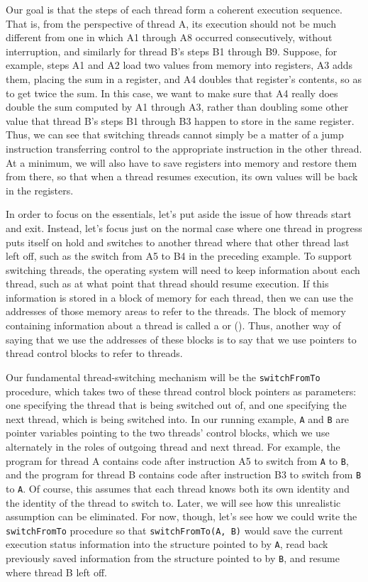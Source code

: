 Our goal is that the steps of each thread form a coherent execution
sequence.  That is, from the perspective of thread A, its execution
should not be much different from one in which A1 through A8 occurred
consecutively, without interruption, and similarly for thread B's
steps B1 through B9.  Suppose, for example, steps A1 and A2 load two
values from memory into registers, A3 adds them, placing the sum in a
register, and A4 doubles that register's contents, so as to get twice
the sum.  In this case, we want to make sure that A4 really does
double the sum computed by A1 through A3, rather than doubling some
other value that thread B's steps B1 through B3 happen to store in the same
register.  Thus, we can see that switching threads cannot simply be a
matter of a jump instruction transferring control to the appropriate
instruction in the other thread.  At a minimum, we will also have to
save registers into memory and restore them from there, so that when a
thread resumes execution, its own values will be back in the
registers.

In order to focus on the essentials, let's put aside the issue of how
threads start and exit.  Instead, let's focus just on the normal case where one
thread in progress puts itself on hold and switches to another thread
where that other thread last left off, such as the switch from A5 to
B4 in the preceding example.  To support switching threads,
the operating system will need to keep information about each thread,
such as at what point that thread should resume execution. If this
information is stored in a block of memory for each thread, then we
can use the addresses of those memory areas to refer to the threads.
The block of memory containing information about a thread is
called a  or
 ().  Thus, another way of
saying that we use the addresses of these blocks is to say that we use
pointers to thread control blocks to refer to threads.

Our fundamental thread-switching mechanism will be the
\verb|switchFromTo| procedure, which takes two of these
thread control block pointers as parameters: one specifying the
thread that is being switched out of, and one specifying the next
thread, which is being switched into.  In our running example,
\verb|A| and \verb|B| are pointer variables pointing to
the two threads' control blocks, which we use alternately in the
roles of outgoing thread and next thread.  For example, the program for
thread A contains code after instruction A5 to switch from
\verb|A| to \verb|B|, and the program for thread B
contains code after instruction B3 to switch from
\verb|B| to \verb|A|. Of course, this assumes that each
thread knows both its own identity and the identity of the thread to
switch to.  Later, we will see how this unrealistic assumption can be
eliminated.  For now, though, let's see how we could write the
\verb|switchFromTo| procedure so that
\verb|switchFromTo(A, B)| would save the current execution
status information into the structure pointed to by \verb|A|,
read back previously saved information from the structure pointed to
by \verb|B|, and resume where thread B left off.

